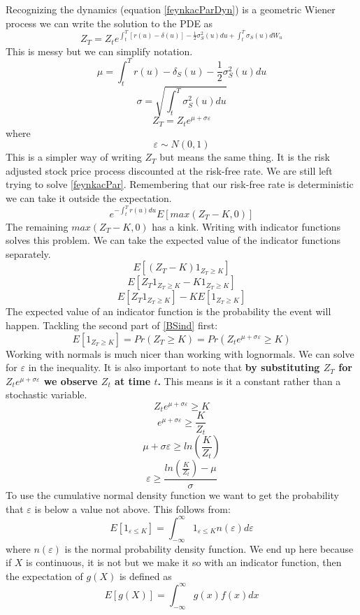 \documentclass[12pt]{article}
\begin{document}
Recognizing the dynamics (equation \ref{feynkacParDyn}) is a geometric Wiener
process we can write the solution to the PDE as
\begin{equation} \label{BSPDE}
  Z_T=Z_te^{\int_t^T\left[ r(u)-\delta(u) \right]
  -\frac{1}{2}\sigma_S^2(u)du
  + \int_t^T\sigma_S(u)dW_u}
\end{equation}
This is messy but we can simplify notation.
$$\mu=\int_t^Tr(u)-\delta_S(u)-\frac{1}{2}\sigma_S^2(u)du$$
$$\sigma=\sqrt{\int_t^T\sigma_S^2(u)du}$$
$$Z_T=Z_te^{\mu+\sigma\varepsilon}$$
where
$$\varepsilon \sim N(0,1)$$
This is a simpler way of writing $Z_T$ but means the same thing. It is the risk
adjusted stock price process discounted at the risk-free rate.
We are still left trying to solve \ref{feynkacPar}. Remembering that our
risk-free rate is deterministic we can take it outside the expectation.
$$e^{-\int_t^Tr(u)du}E[max(Z_T-K,0)]$$
The remaining $max(Z_T-K,0)$ has a kink. Writing with indicator
functions solves this problem. We can take the expected value of the indicator
functions separately.
$$E\left[ (Z_T-K)1_{Z_T\geq K} \right] $$
$$E\left[ Z_T1_{Z_T\geq K} - K1_{Z_T\geq K} \right] $$
\begin{equation} \label{BSind}
  E\left[ Z_T1_{Z_T\geq K} \right] - KE\left[ 1_{Z_T\geq K} \right]
\end{equation}
The expected value of an indicator function is the probability the event
will happen. Tackling the second part of \ref{BSind} first:
$$E\left[ 1_{Z_T\geq K}\right] =Pr(Z_T\geq K) =
Pr(Z_te^{\mu +\sigma\varepsilon}\geq K)$$
Working with normals is much nicer than working with lognormals. We can solve
for $\varepsilon$ in the inequality. It is also important to note
that \textbf{by substituting $Z_T$ for $Z_te^{\mu+\sigma\varepsilon}$ we
observe $Z_t$ at time $t$.}
This means is it a constant rather than a stochastic variable.
$$Z_te^{\mu +\sigma\varepsilon}\geq K$$
$$e^{\mu +\sigma\varepsilon}\geq\frac{K}{Z_t}$$
$$\mu +\sigma\varepsilon\geq ln\left( \frac{K}{Z_t} \right)$$
$$\varepsilon\geq\frac{ln\left( \frac{K}{Z_t} \right)
-\mu}{\sigma}$$
To use the cumulative normal density function we want to get the probability
that $\varepsilon$ is below a value not above.
This follows from:
$$E\left[ 1_{\varepsilon\leq K} \right] =
\int_{-\infty}^{\infty} 1_{\varepsilon\leq K} n(\varepsilon)d\varepsilon$$
where $n(\varepsilon)$ is the normal probability density function.
We end up here because if $X$ is continuous,
it is not but we make it so with an indicator function,
then the expectation of $g(X)$ is defined as
$$E[g(X)]=\int_{-\infty}^{\infty}g(x)f(x)dx$$
\end{document}
